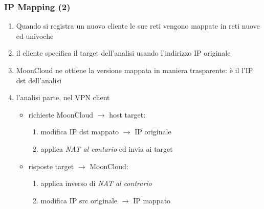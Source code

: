 \begin{frame}
	\frametitle{IP Mapping (2)}
	\begin{enumerate}
		\item Quando si registra un nuovo cliente le sue reti vengono \alert{mappate}
		      in reti nuove ed univoche
		      		      
		\item il cliente specifica il target dell'analisi usando l'indirizzo IP originale
		      		              
		\item MoonCloud ne ottiene la \alert{versione mappata} in maniera
		      \alert{trasparente}: è il l'IP dst dell'analisi
		      		      
		\item l'analisi parte, nel \alert{VPN client}
		      \begin{itemize}
		      	\item richieste MoonCloud $\rightarrow$ host target:
		      	      \begin{enumerate}
		      	      	\item modifica IP dst mappato $\rightarrow$ IP originale
		      	      	\item applica \textit{NAT al contario} ed invia ai target
		      	      \end{enumerate}
		      	\item risposte target $\rightarrow$ MoonCloud:
		      	      \begin{enumerate}
		      	      	\item applica inverso di \textit{NAT al contrario}
		      	      	\item modifica IP src originale $\rightarrow$ IP mappato
		      	      \end{enumerate}
		      \end{itemize}
		      		      
	\end{enumerate}
		
\end{frame}

